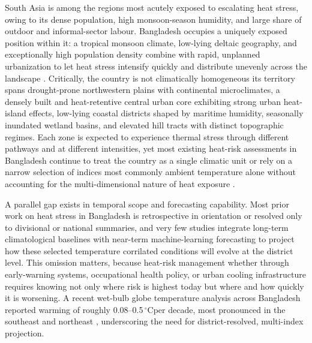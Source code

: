 \documentclass[review,11pt]{elsarticle}
\newcommand{\degC}{\ensuremath{^{\circ}\mathrm{C}}}
\begin{document}
South Asia is among the regions most acutely exposed to escalating heat stress,
owing to its dense population, high monsoon-season humidity, and large share of
outdoor and informal-sector labour. Bangladesh occupies a uniquely exposed
position within it: a tropical monsoon climate, low-lying deltaic geography, and
exceptionally high population density combine with rapid, unplanned urbanization
to let heat stress intensify quickly and distribute unevenly across the landscape
\citep{Sultana2021}. Critically, the country is not climatically homogeneous its
territory spans drought-prone northwestern plains with continental microclimates,
a densely built and heat-retentive central urban core exhibiting strong urban
heat-island effects, low-lying coastal districts shaped by maritime humidity,
seasonally inundated wetland basins, and elevated hill tracts with distinct
topographic regimes. Each zone is expected to experience thermal stress through
different pathways and at different intensities, yet most existing heat-risk
assessments in Bangladesh continue to treat the country as a single climatic unit
or rely on a narrow selection of indices most commonly ambient temperature
alone without accounting for the multi-dimensional nature of heat exposure
\citep{Abrar2022}.

A parallel gap exists in temporal scope and forecasting capability. Most prior
work on heat stress in Bangladesh is retrospective in orientation or resolved only
to divisional or national summaries, and very few studies integrate long-term
climatological baselines with near-term machine-learning forecasting to project
how these selected temperature corrilated conditions will evolve at the district level. This omission matters,
because heat-risk management whether through early-warning systems, occupational
health policy, or urban cooling infrastructure requires knowing not only where
risk is highest today but where and how quickly it is worsening. A recent
wet-bulb globe temperature analysis across Bangladesh reported warming of roughly
0.08--0.5\,\degC per decade, most pronounced in the southeast and northeast
\citep{kamal2024scientific}, underscoring the need for district-resolved, multi-index
projection.
\end{document}
